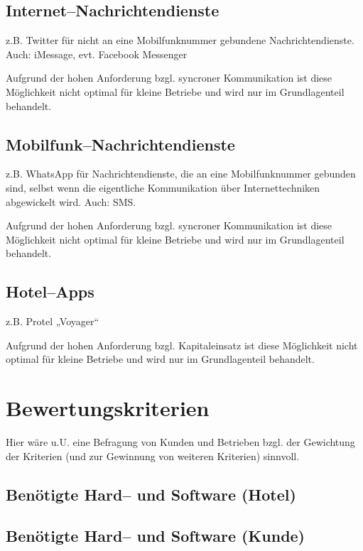 \subsection{Internet--Nachrichtendienste}

z.B. Twitter für nicht an eine Mobilfunknummer gebundene Nachrichtendienste. Auch: iMessage, evt. Facebook Messenger

Aufgrund der hohen Anforderung bzgl. syncroner Kommunikation ist diese Möglichkeit nicht optimal für kleine Betriebe und wird nur im Grundlagenteil behandelt.

\subsection{Mobilfunk--Nachrichtendienste}

z.B. WhatsApp für Nachrichtendienste, die an eine Mobilfunknummer gebunden sind, selbst wenn die eigentliche Kommunikation über Internettechniken abgewickelt wird. Auch: SMS.

Aufgrund der hohen Anforderung bzgl. syncroner Kommunikation ist diese Möglichkeit nicht optimal für kleine Betriebe und wird nur im Grundlagenteil behandelt.

\subsection{Hotel--Apps}

z.B. Protel „Voyager“

Aufgrund der hohen Anforderung bzgl. Kapitaleinsatz ist diese Möglichkeit nicht optimal für kleine Betriebe und wird nur im Grundlagenteil behandelt.

\section{Bewertungskriterien}
\label{sec:kriterien}

Hier wäre u.U. eine Befragung von Kunden und Betrieben bzgl. der Gewichtung der Kriterien (und zur Gewinnung von weiteren Kriterien) sinnvoll.

\subsection{Benötigte Hard-- und Software (Hotel)}
\subsection{Benötigte Hard-- und Software (Kunde)}
